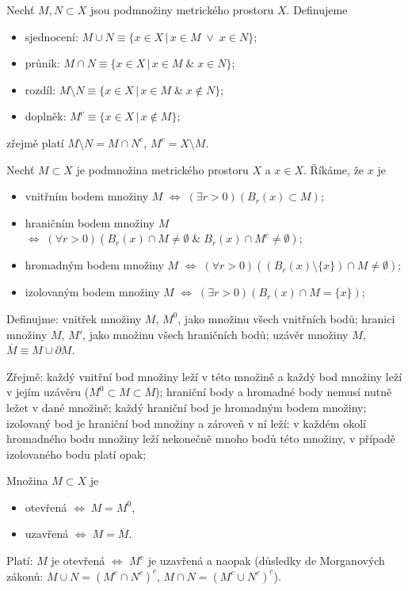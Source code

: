 Nechť $M,N\subset X$ jsou podmnožiny metrického prostoru $X$.
Definujeme
\begin{itemize}
   \item sjednocení: $M\cup N\equiv\{x\in X\,|\,x\in M\;\vee\;x\in N\}$;
   \item průnik: $M\cap N\equiv\{x\in X\,|\,x\in M\;\&\;x\in N\}$;
   \item rozdíl: $M\setminus N\equiv\{x\in X\,|\,x\in M\;\&\;x\not\in N\}$;
   \item doplněk: $M^c\equiv\{x\in X\,|\,x\not\in M\}$;
\end{itemize}
zřejmě platí $M\setminus N=M\cap N^c$, $M^c = X\setminus M$.

Nechť $M\subset X$ je podmnožina metrického prostoru $X$ a $x\in X$.
Říkáme, že $x$ je
\begin{itemize}
   \item vnitřním bodem množiny $M$ 
         $\Leftrightarrow\;(\exists r>0)(B_r(x)\subset M)$;
   \item hraničním bodem množiny $M$
         $\Leftrightarrow\;(\forall r>0)(B_r(x)\cap M\neq\emptyset
           \;\&\;B_r(x)\cap M^c\neq\emptyset)$;
   \item hromadným bodem množiny $M$
         $\Leftrightarrow\;(\forall r>0)((B_r(x)\setminus\{x\})\cap M\neq\emptyset)$;
   \item izolovaným bodem množiny $M$
         $\Leftrightarrow\;(\exists r>0)(B_r(x)\cap M=\{x\})$;
\end{itemize}
Definujme: vnitřek množiny $M$, $M^0$, jako množinu všech vnitřních bodů;
           hranici množiny $M$, $M'$, jako množinu všech hraničních bodů;
           uzávěr množiny $M$, $\overline{M}\equiv M\cup\partial M$.

Zřejmě: každý vnitřní bod množiny leží v této množině  
        a každý bod množiny leží v jejím uzávěru ($M^0\subset M\subset\overline{M}$);
        hraniční body a hromadné body nemusí nutně ležet v dané množině;
        každý hraniční bod je hromadným bodem množiny;
        izolovaný bod je hraniční bod množiny a zároveň v ní leží;
        v každém okolí hromadného bodu množiny leží nekonečně mnoho bodů této množiny,
        v případě izolovaného bodu platí opak;

Množina $M\subset X$ je
\begin{itemize}
   \item otevřená $\Leftrightarrow \; M=M^0$,
   \item uzavřená $\Leftrightarrow \; M=\overline{M}$.
\end{itemize}
Platí: $M$ je otevřená $\Leftrightarrow$ $M^c$ je uzavřená
       a naopak
       (důsledky de Morganových zákonů:
        $M\cup N=(M^c\cap N^c)^c$, $M\cap N=(M^c\cup N^c)^c$).

